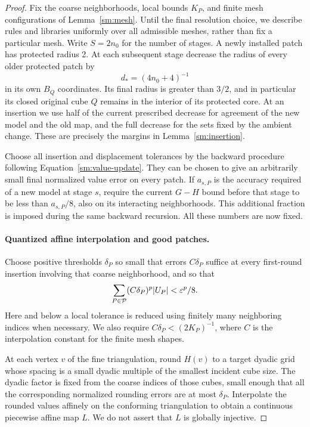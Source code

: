 \begin{proof}
Fix the coarse neighborhoods, local bounds $K_P$, and finite
mesh configurations of Lemma~\ref{sm:mesh}.  Until the final resolution
choice, we describe rules and libraries uniformly over all admissible
meshes, rather than fix a particular mesh.  Write
$S=2n_0$ for the number of stages.  A newly installed patch
has protected radius 2.  At each subsequent stage decrease
the radius of every older protected patch by
\begin{equation}
 \label{sm:shrink-size}
 d_*=(4n_0+4)^{-1}
\end{equation}
in its own $B_Q$ coordinates.  Its final radius is greater
than $3/2$, and in particular its closed original cube $Q$
remains in the interior of its protected core.  At an
insertion we use half of the current prescribed decrease
for agreement of the new model and the old map, and the
full decrease for the sets fixed by the ambient change.
These are precisely the margins in
Lemma~\ref{sm:insertion}.

Choose all insertion and displacement tolerances by the
backward procedure following Equation~\eqref{sm:value-update}.
They can be chosen to give an arbitrarily small final
normalized value error on every patch.  If $a_{s,P}$ is
the accuracy required of a new model at stage $s$, require
the current $G-H$ bound before that stage to be less than
$a_{s,P}/8$, also on its interacting neighborhoods.  This
additional fraction is imposed during the same backward
recursion.  All these numbers are now fixed.

\paragraph{Quantized affine interpolation and good patches.}
Choose positive thresholds $\delta_P$ so small that errors
$C\delta_P$ suffice at every first-round insertion involving
that coarse neighborhood, and so that
\begin{equation}
 \label{sm:good-error-budget}
 \sum_{P\in\mathcal P}(C\delta_P)^p |U_P|<\varepsilon^p/8.
\end{equation}
Here and below a local tolerance is reduced using finitely many
neighboring indices when necessary.  We also require
$C\delta_P<(2K_P)^{-1}$, where $C$ is the interpolation
constant for the finite mesh shapes.

At each vertex $v$ of the fine triangulation, round $H(v)$
to a target dyadic grid whose spacing is a small dyadic
multiple of the smallest incident cube size.  The dyadic
factor is fixed from the coarse indices of those cubes,
small enough that all the corresponding normalized
rounding errors are at most $\delta_P$.  Interpolate
the rounded values affinely on the conforming
triangulation to obtain a continuous piecewise affine
map $L$.  We do not assert that $L$ is globally injective.


\end{proof}
